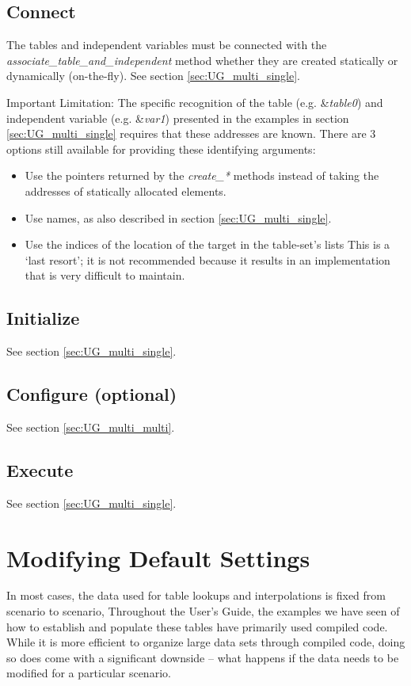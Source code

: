 \documentclass[11pt,fleqn]{report}
\begin{document}
\subsection{Connect}
The tables and independent variables must be connected with the
\textit{associate\_table\_and\_independent} method whether they are created
 statically or dynamically (on-the-fly).
 See section \ref{sec:UG_multi_single}.

Important Limitation:  The specific recognition of the table
 (e.g. \&\textit{table0}) and independent variable (e.g. \&\textit{var1})
 presented in the examples in section \ref{sec:UG_multi_single} requires
 that these addresses are known.  There are 3 options still available for
 providing these identifying arguments:
\begin{itemize}
 \item Use the pointers returned by the \textit{create\_*} methods instead
       of taking the addresses of statically allocated elements.
 \item Use names, as also described in section \ref{sec:UG_multi_single}.
 \item Use the indices of the location of the target in the table-set's lists
       This is a `last resort'; it is not recommended because it results in
       an implementation that is very difficult to maintain.
\end{itemize}


\subsection{Initialize}
See section \ref{sec:UG_multi_single}.

\subsection{Configure (optional)}
See section \ref{sec:UG_multi_multi}.

\subsection{Execute}
See section \ref{sec:UG_multi_single}.


\section{Modifying Default Settings}\label{sec:UG_bias_scale}

In most cases, the data used for table lookups and interpolations is fixed
from scenario to scenario,  Throughout the User's Guide, the examples we
have seen of how to establish and populate these tables have primarily
used compiled code.  While it is more efficient to organize large data
sets through compiled code, doing so does come with a significant downside
-- what happens if the data needs to be modified for a particular scenario.
\end{document}
